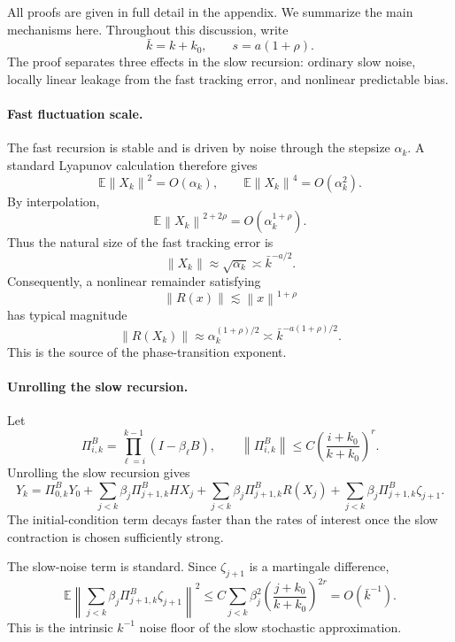 \documentclass{article}
\newcommand{\E}{\mathbb{E}}
\newcommand{\norm}[1]{\left\lVert #1\right\rVert}
\begin{document}
All proofs are given in full detail in the appendix. We summarize the main mechanisms here. Throughout this discussion, write
\[
  \bar k=k+k_0,
  \qquad
  s=a(1+\rho).
\]
The proof separates three effects in the slow recursion: ordinary slow noise, locally linear leakage from the fast tracking error, and nonlinear predictable bias.

\paragraph{Fast fluctuation scale.}
The fast recursion is stable and is driven by noise through the stepsize $\alpha_k$. A standard Lyapunov calculation therefore gives
\[
  \E\norm{X_k}^2=O(\alpha_k),
  \qquad
  \E\norm{X_k}^4=O(\alpha_k^2).
\]
By interpolation,
\[
  \E\norm{X_k}^{2+2\rho}=O(\alpha_k^{1+\rho}).
\]
Thus the natural size of the fast tracking error is
\[
  \norm{X_k}\approx \sqrt{\alpha_k}\asymp \bar k^{-a/2}.
\]
Consequently, a nonlinear remainder satisfying
\[
  \norm{R(x)}\lesssim \norm{x}^{1+\rho}
\]
has typical magnitude
\[
  \norm{R(X_k)}
  \approx
  \alpha_k^{(1+\rho)/2}
  \asymp
  \bar k^{-a(1+\rho)/2}.
\]
This is the source of the phase-transition exponent.

\paragraph{Unrolling the slow recursion.}
Let
\[
  \Pi^B_{i,k}=\prod_{\ell=i}^{k-1}(I-\beta_\ell B),
  \qquad
  \norm{\Pi^B_{i,k}}\le C\left(\frac{i+k_0}{k+k_0}\right)^r .
\]
Unrolling the slow recursion gives
\[
  Y_k
  =
  \Pi^B_{0,k}Y_0
  +
  \sum_{j<k}\beta_j\Pi^B_{j+1,k}HX_j
  +
  \sum_{j<k}\beta_j\Pi^B_{j+1,k}R(X_j)
  +
  \sum_{j<k}\beta_j\Pi^B_{j+1,k}\zeta_{j+1}.
\]
The initial-condition term decays faster than the rates of interest once the slow contraction is chosen sufficiently strong.

The slow-noise term is standard. Since $\zeta_{j+1}$ is a martingale difference,
\[
  \E\left\|
  \sum_{j<k}\beta_j\Pi^B_{j+1,k}\zeta_{j+1}
  \right\|^2
  \le
  C\sum_{j<k}\beta_j^2
  \left(\frac{j+k_0}{k+k_0}\right)^{2r}
  =
  O(\bar k^{-1}).
\]
This is the intrinsic $k^{-1}$ noise floor of the slow stochastic approximation.
\end{document}
